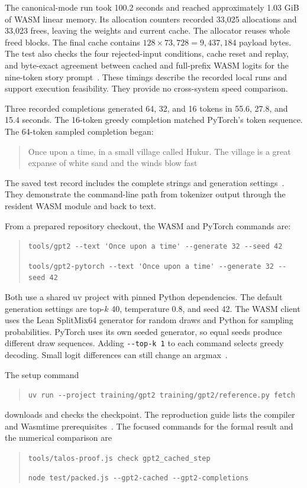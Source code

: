 \documentclass[11pt]{article}
\begin{document}
The canonical-mode run took 100.2 seconds and reached approximately 1.03 GiB of WASM linear memory.  Its allocation counters recorded 33,025 allocations and 33,023 frees, leaving the weights and current cache.  The allocator reuses whole freed blocks.  The final cache contains $128\times73{,}728=9{,}437{,}184$ payload bytes.  The test also checks the four rejected-input conditions, cache reset and replay, and byte-exact agreement between cached and full-prefix WASM logits for the nine-token story prompt~\cite{tests,testcode}.  These timings describe the recorded local runs and support execution feasibility.  They provide no cross-system speed comparison.

Three recorded completions generated 64, 32, and 16 tokens in 55.6, 27.8, and 15.4 seconds.  The 16-token greedy completion matched PyTorch's token sequence.  The 64-token sampled completion began:
\begin{quote}
Once upon a time, in a small village called Hukur. The village is a great expanse of white sand and the winds blow fast
\end{quote}
The saved test record includes the complete strings and generation settings~\cite{tests}.  They demonstrate the command-line path from tokenizer output through the resident WASM module and back to text.

From a prepared repository checkout, the WASM and PyTorch commands are:
\begin{quote}\small\ttfamily
\verb|tools/gpt2 --text 'Once upon a time' --generate 32 --seed 42|

\verb|tools/gpt2-pytorch --text 'Once upon a time' --generate 32 --seed 42|
\end{quote}
Both use a shared uv project with pinned Python dependencies.  The default generation settings are top-$k$ 40, temperature 0.8, and seed 42.  The WASM client uses the Lean SplitMix64 generator for random draws and Python for sampling probabilities.  PyTorch uses its own seeded generator, so equal seeds produce different draw sequences.  Adding \verb|--top-k 1| to each command selects greedy decoding.  Small logit differences can still change an argmax~\cite{driver}.

The setup command
\begin{quote}\small\ttfamily
\verb|uv run --project training/gpt2 training/gpt2/reference.py fetch|
\end{quote}
downloads and checks the checkpoint.  The reproduction guide lists the compiler and Wasmtime prerequisites~\cite{guide}.  The focused commands for the formal result and the numerical comparison are
\begin{quote}\small\ttfamily
\verb|tools/talos-proof.js check gpt2_cached_step|

\verb|node test/packed.js --gpt2-cached --gpt2-completions|
\end{quote}
\end{document}

